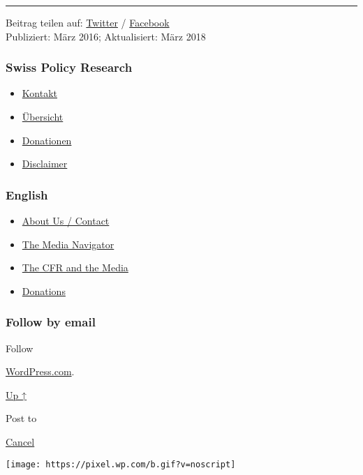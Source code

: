 \begin{center}\rule{0.5\linewidth}{\linethickness}\end{center}

Beitrag teilen auf:
\href{https://twitter.com/intent/tweet?url=https://swprs.org/anschlag-auf-die-forschungsfreiheit/}{Twitter}
/
\href{https://www.facebook.com/share.php?u=https://swprs.org/anschlag-auf-die-forschungsfreiheit/}{Facebook}\\
Publiziert: März 2016; Aktualisiert: März 2018

\hypertarget{swiss-policy-research}{%
\subsubsection{Swiss Policy Research}\label{swiss-policy-research}}

\begin{itemize}
\tightlist
\item
  \href{https://swprs.org/kontakt/}{Kontakt}
\item
  \href{https://swprs.org/uebersicht/}{Übersicht}
\item
  \href{https://swprs.org/donationen/}{Donationen}
\item
  \href{https://swprs.org/disclaimer/}{Disclaimer}
\end{itemize}

\hypertarget{english}{%
\subsubsection{English}\label{english}}

\begin{itemize}
\tightlist
\item
  \href{https://swprs.org/contact/}{About Us / Contact}
\item
  \href{https://swprs.org/media-navigator/}{The Media Navigator}
\item
  \href{https://swprs.org/the-american-empire-and-its-media/}{The CFR
  and the Media}
\item
  \href{https://swprs.org/donations/}{Donations}
\end{itemize}

\hypertarget{follow-by-email}{%
\subsubsection{Follow by email}\label{follow-by-email}}

Follow

\href{https://wordpress.com/?ref=footer_custom_com}{WordPress.com}.

\protect\hyperlink{}{Up ↑}

Post to

\protect\hyperlink{}{Cancel}

\texttt{[image: https://pixel.wp.com/b.gif?v=noscript]}
